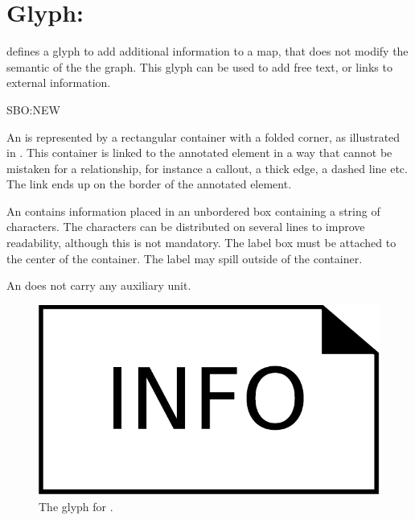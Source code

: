 
\section{Glyph: }
\label{sec:annotation}

\SBGNERLone defines a glyph to add additional information to a map, that does not modify the semantic of the the graph. This glyph can be used to add free text, or links to external information.

\begin{glyphDescription}

\glyphSboTerm SBO:NEW

\glyphContainer An  is represented by a rectangular container with a folded corner, as illustrated in . This container is linked to the annotated element in a way that cannot be mistaken for a relationship, for instance a callout, a thick edge, a dashed line etc. The link ends up on the border of the annotated element.

\glyphLabel An  contains information placed in an unbordered box containing a string of characters.  The characters can be distributed on several lines to improve readability, although this is not mandatory.  The label box must be attached to the center of the container. The label may spill outside of the container. 

\glyphAux An  does not carry any auxiliary unit.
\end{glyphDescription}

\begin{figure}[H]
  \centering
  \includegraphics[scale = 0.3]{images/annotation}
  \caption{The \ER glyph for .}
  \label{fig:annotation}
\end{figure}


